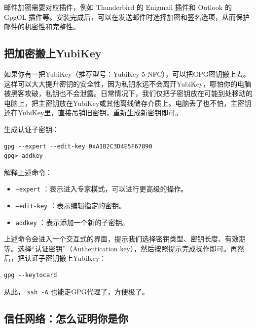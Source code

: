 邮件加密需要对应插件，例如 Thunderbird 的 Enigmail 插件和 Outlook 的 GpgOL 插件等。安装完成后，可以在发送邮件时选择加密和签名选项，从而保护邮件的机密性和完整性。

\subsection{把加密搬上YubiKey}

如果你有一把YubiKey（推荐型号：YubiKey 5 NFC），可以把GPG密钥搬上去。这样可以大大提升密钥的安全性，因为私钥永远不会离开YubiKey，哪怕你的电脑被黑客攻破，私钥也不会泄露。日常情况下，我们仅把子密钥放在可能到处移动的电脑上，把主密钥放在YubiKey或其他离线储存介质上。电脑丢了也不怕，主密钥还在YubiKey里，直接吊销旧密钥，重新生成新密钥即可。

生成认证子密钥：
\begin{verbatim}
gpg --expert --edit-key 0xA1B2C3D4E5F67890
gpg> addkey
\end{verbatim}
解释上述命令：
\begin{itemize}
  \item  \texttt{--expert} ：表示进入专家模式，可以进行更高级的操作。
  \item  \texttt{--edit-key} ：表示编辑指定的密钥。
  \item  \texttt{addkey} ：表示添加一个新的子密钥。
\end{itemize}
上述命令会进入一个交互式的界面，提示我们选择密钥类型、密钥长度、有效期等。选择“认证密钥”（Authentication key），然后按照提示完成操作即可。再然后，把认证子密钥搬上YubiKey：
\begin{verbatim}
gpg --keytocard
\end{verbatim}

从此， \texttt{ssh -A} 也能走GPG代理了，方便极了。

\subsection{信任网络：怎么证明你是你}


